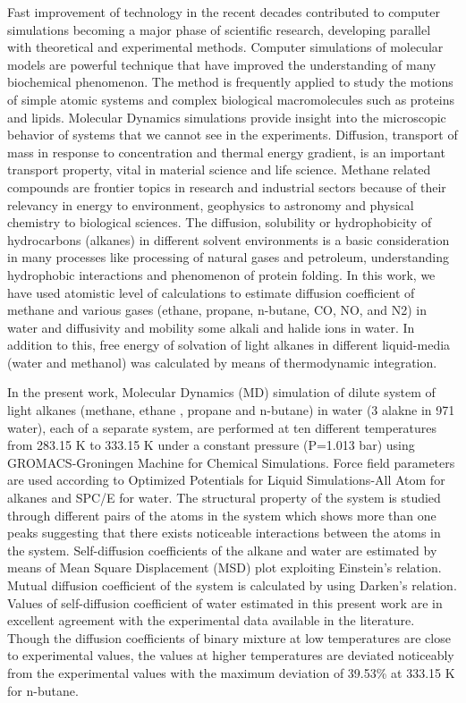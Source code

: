 \vspace{0.25cm}
{\small{Fast improvement of technology in the recent decades contributed to computer simulations becoming
a major phase of scientific research, developing parallel with theoretical and experimental methods. Computer simulations of molecular models are powerful technique that have improved the understanding of many biochemical phenomenon. The method is frequently applied to study the motions of simple atomic systems and complex  biological macromolecules such as proteins and lipids. Molecular Dynamics simulations  provide insight into the microscopic behavior of systems that we cannot see in the experiments. Diffusion, transport of mass in response to concentration and thermal energy gradient, is an important transport property, vital in material science and life science. Methane related compounds are frontier topics in research and industrial sectors because of their relevancy in energy to environment, geophysics to astronomy and physical chemistry to biological sciences. The diffusion, solubility or hydrophobicity of hydrocarbons (alkanes) in different  solvent environments is a basic consideration in many processes like processing of natural gases and petroleum, understanding hydrophobic interactions and phenomenon of protein folding. In this work, we have used atomistic level of calculations to estimate diffusion coefficient of methane and various gases (ethane, propane, n-butane, CO, NO, and  N2) in water and diffusivity and mobility some alkali  and halide ions in water. In addition to this,  free energy of solvation of  light alkanes  in different liquid-media (water and methanol)  was calculated by means of thermodynamic integration.

In the present work, Molecular Dynamics (MD) simulation of dilute system of light alkanes (methane, ethane , propane and  n-butane) in water (3 alakne in 971 water), each of a separate system, are performed at ten different temperatures  from 283.15 K to 333.15 K  under a constant pressure (P=1.013 bar)  using GROMACS-Groningen Machine for Chemical Simulations. Force field parameters are used according to Optimized Potentials for Liquid Simulations-All Atom for alkanes and SPC/E for water. The structural property of the system is studied through different pairs of the atoms in the system which shows more than one peaks suggesting that there exists noticeable interactions between the atoms in the system. Self-diffusion coefficients of the alkane and water are estimated by means of Mean Square Displacement (MSD) plot exploiting Einstein's relation. Mutual diffusion coefficient of the system
is calculated by using Darken's relation. Values of self-diffusion coefficient of water
estimated in this present work are in excellent agreement with the experimental data
available in the literature. Though the diffusion coefficients of binary mixture at
low temperatures are close to experimental values, the values at higher temperatures
are deviated noticeably from the experimental values with the maximum deviation
of 39.53\% at 333.15 K for n-butane. 

}}
